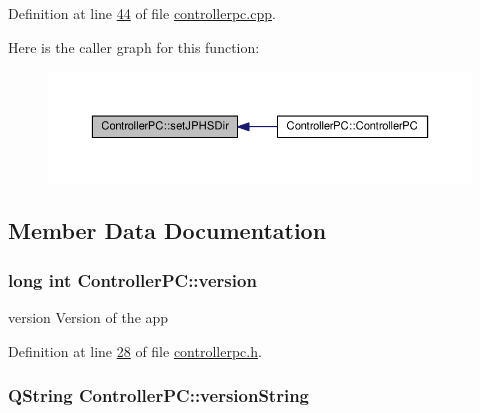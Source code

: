 Definition at line \hyperlink{controllerpc_8cpp_source_l00044}{44} of file \hyperlink{controllerpc_8cpp_source}{controllerpc.\+cpp}.



Here is the caller graph for this function\+:
\nopagebreak
\begin{figure}[H]
\begin{center}
\leavevmode
\includegraphics[width=350pt]{class_controller_p_c_ac00d29685a7e5b780c01eb438e10f96d_icgraph}
\end{center}
\end{figure}




\subsection{Member Data Documentation}
\subsubsection[{\texorpdfstring{version}{version}}]{\setlength{\rightskip}{0pt plus 5cm}long int Controller\+P\+C\+::version}\hypertarget{class_controller_p_c_a9eb43c34237d66751a6411e55cf5f55e}{}\label{class_controller_p_c_a9eb43c34237d66751a6411e55cf5f55e}


version Version of the app 



Definition at line \hyperlink{controllerpc_8h_source_l00028}{28} of file \hyperlink{controllerpc_8h_source}{controllerpc.\+h}.

\subsubsection[{\texorpdfstring{version\+String}{versionString}}]{\setlength{\rightskip}{0pt plus 5cm}Q\+String Controller\+P\+C\+::version\+String}\hypertarget{class_controller_p_c_a0e63cca37d6ce2e660f3380400c2c5f3}{}\label{class_controller_p_c_a0e63cca37d6ce2e660f3380400c2c5f3}


